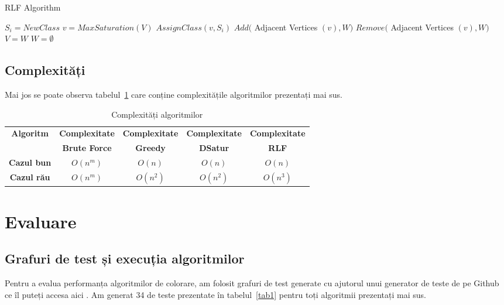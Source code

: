 \documentclass[runningheads]{llncs}
\begin{document}
\begin{algorithm}
\caption{RLF Algorithm}
\label{alg4}
\begin{algorithmic}[1]
\State $S_i = NewClass$
\State $v = MaxSaturation(V)$
\State $AssignClass(v, S_i)$
\State $Add($ Adjacent Vertices $(v), W)$
\State $Remove($ Adjacent Vertices $(v), W)$
\EndWhile
\State $V = W$
\State $W = \emptyset$
\EndWhile
\EndProcedure
\end{algorithmic}
\end{algorithm}

\subsection{Complexități}
Mai jos se poate observa tabelul~\ref{tabel_complexitate} care conține complexitățile algoritmilor
prezentați mai sus.

\begin{table}[h]
\centering
\caption{Complexități algoritmilor}
\label{tabel_complexitate}
\begin{tabular}{|c|c|c|c|c|}
\hline

\textbf{Algoritm} & \textbf{Complexitate} & \textbf{Complexitate} & \textbf{Complexitate} & \textbf{Complexitate} \\
 & \textbf{Brute Force} & \textbf{Greedy} & \textbf{DSatur} & \textbf{RLF} \\
\hline
\hline
\textbf{Cazul bun} & $O(n^m)$ & $O(n)$ & $O(n)$ & $O(n)$ \\
\hline
\textbf{Cazul rău} & $O(n^m)$ & $O(n^2)$ & $O(n^2)$ & $O(n^3)$ \\
\hline
\end{tabular}
\end{table}

\section{Evaluare}
\subsection{Grafuri de test și execuția algoritmilor}
Pentru a evalua performanța algoritmilor de colorare, am folosit grafuri de test
generate cu ajutorul unui generator de teste de pe Github ce îl puteți accesa aici \cite{16}.
Am generat 34 de teste prezentate în tabelul~\ref{tab1} pentru toți algoritmii
prezentați mai sus.
\end{document}
